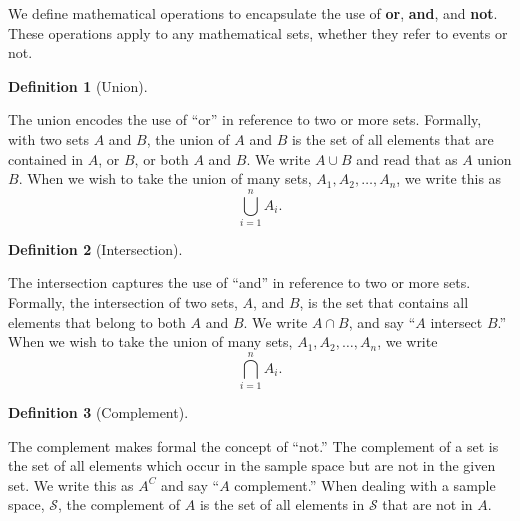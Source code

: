 \documentclass[
  letterpaper,
  DIV=11,
  numbers=noendperiod]{scrreprt}
\theoremstyle{definition}
\theoremstyle{definition}
\theoremstyle{definition}
\newtheorem{definition}{Definition}[chapter]
\theoremstyle{remark}
\begin{document}
We define mathematical operations to encapsulate the use of \textbf{or},
\textbf{and}, and \textbf{not}. These operations apply to any
mathematical sets, whether they refer to events or not.

\begin{definition}[Union]\protect\hypertarget{def-union}{}\label{def-union}

The union encodes the use of ``or'' in reference to two or more sets.
Formally, with two sets \(A\) and \(B\), the union of \(A\) and \(B\) is
the set of all elements that are contained in \(A\), or \(B\), or both
\(A\) and \(B\). We write \(A \cup B\) and read that as \(A\) union
\(B\). When we wish to take the union of many sets,
\(A_1,A_2,\dots,A_n\), we write this as \[\bigcup_{i=1}^n A_i.\]

\end{definition}

\begin{definition}[Intersection]\protect\hypertarget{def-intersection}{}\label{def-intersection}

The intersection captures the use of ``and'' in reference to two or more
sets. Formally, the intersection of two sets, \(A\), and \(B\), is the
set that contains all elements that belong to both \(A\) and \(B\). We
write \(A \cap B\), and say ``\(A\) intersect \(B\).'' When we wish to
take the union of many sets, \(A_1,A_2,\dots,A_n\), we write
\[\bigcap_{i=1}^n A_i.\]

\end{definition}

\begin{definition}[Complement]\protect\hypertarget{def-complement}{}\label{def-complement}

The complement makes formal the concept of ``not.'' The complement of a
set is the set of all elements which occur in the sample space but are
not in the given set. We write this as \(A^C\) and say ``\(A\)
complement.'' When dealing with a sample space, \(\mathcal{S}\), the
complement of \(A\) is the set of all elements in \(\mathcal{S}\) that
are not in \(A\).

\end{definition}
\end{document}
